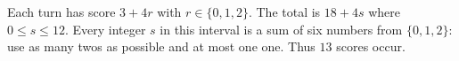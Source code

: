 Each turn has score $ 3+4r $ with $ r\in\{0,1,2\}$. The total is $ 18+4s $ where $ 0\le s\le12 $. Every integer $ s $ in this interval is a sum of six numbers from $\{0,1,2\}$: use as many twos as possible and at most one one. Thus $\boxed{13}$ scores occur.
